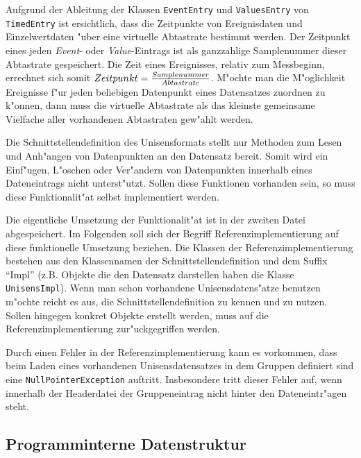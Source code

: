 Aufgrund der Ableitung der Klassen \verb|EventEntry| und \verb|ValuesEntry| von \verb|TimedEntry| ist ersichtlich, dass die Zeitpunkte von Ereignisdaten und Einzelwertdaten "uber eine virtuelle Abtastrate bestimmt werden.
Der Zeitpunkt eines jeden \emph{Event}- oder \emph{Value}-Eintrags ist als ganzzahlige Samplenummer dieser Abtastrate gespeichert.
Die Zeit eines Ereignisses, relativ zum Messbeginn, errechnet sich somit $Zeitpunkt = {Samplenummer \over Abtastrate}$.
M"ochte man die M"oglichkeit Ereignisse f"ur jeden beliebigen Datenpunkt eines Datensatzes zuordnen zu k"onnen, dann muss die virtuelle Abtastrate als das kleinste gemeinsame Vielfache aller vorhandenen Abtastraten gew"ahlt werden.

Die Schnittstellendefinition des Unisensformats stellt nur Methoden zum Lesen und Anh"angen von Datenpunkten an den Datensatz bereit.
Somit wird ein Einf"ugen, L"oschen oder Ver"andern von Datenpunkten innerhalb eines Dateneintrags nicht unterst"utzt.
Sollen diese Funktionen vorhanden sein, so muss diese Funktionalit"at selbst implementiert werden.

Die eigentliche Umsetzung der Funktionalit"at ist in der zweiten Datei abgespeichert.
Im Folgenden soll sich der Begriff Referenzimplementierung auf diese funktionelle Umsetzung beziehen.
Die Klassen der Referenzimplementierung bestehen aus den Klassennamen der Schnittstellendefinition und dem Suffix "`Impl"' (z.B. Objekte die den Datensatz darstellen haben die Klasse \verb|UnisensImpl|).
Wenn man schon vorhandene Unisensdatens"atze benutzen m"ochte reicht es aus, die Schnittstellendefinition zu kennen und zu nutzen.
Sollen hingegen konkret Objekte erstellt werden, muss auf die Referenzimplementierung zur"uckgegriffen werden.

Durch einen Fehler in der Referenzimplementierung kann es vorkommen, dass beim Laden eines vorhandenen Unisensdatensatzes in dem Gruppen definiert sind eine \verb|NullPointerException| auftritt.
Insbesondere tritt dieser Fehler auf, wenn innerhalb der Headerdatei der Gruppeneintrag nicht hinter den Dateneintr"agen steht.

\subsection{Programminterne Datenstruktur}

